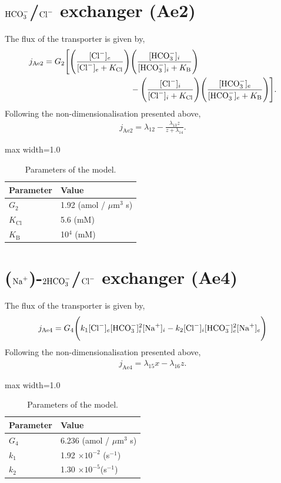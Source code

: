 \documentclass{svjour3}
\newcommand{\na}{{\rm Na}^+}
\newcommand{\bna}{[{\rm Na}^+]_i}
\newcommand{\hco}{{\rm HCO}_3^-}
\newcommand{\bhco}{[{\rm HCO}_3^-]_i}
\newcommand{\cl}{{\rm Cl}^-}
\newcommand{\bcl}{[{\rm Cl}^-]_i}
\begin{document}
\section*{\Large $\hco$/$\cl$ exchanger (Ae2)}
The flux of the transporter is given by,
\begin{align*}
j_{\text{Ae2}}=G_2 \Bigg[ \Bigg( \frac{[\cl]_e}{[\cl]_e + K_{\text{Cl}}} \Bigg)  & \Bigg( \frac{\bhco}{\bhco + K_{\text{B}}}\Bigg) \\
& -\Bigg( \frac{\bcl}{\bcl + K_{\text{Cl}}}\Bigg) \Bigg( \frac{[\hco]_e  }{[\hco]_e + K_{\text{B}}}  \Bigg) \Bigg].
\end{align*}
Following the non-dimensionalisation presented above,
\begin{align}
j_{\text{Ae2}}=\lambda_{12}-\frac{\lambda_{13} z}{z+\lambda_{14}}.
\end{align}
\begin{table}[H]
\centering
\captionsetup{justification=centering} 
\caption{Parameters of the model.}
\begin{adjustbox}{max width=1.0\textwidth}
\begin{tabular}{@{}ll@{}}
\toprule
\bf{Parameter}				& \bf{Value}										\\ \midrule
$G_2$						& 1.92	(amol / $\mu \text{m}^3$ s)				\\
$K_{\text{Cl}}$ 				& 5.6 	(mM)										\\	
$K_{\text{B}}$				& 10$^4$	(mM)										\\
\bottomrule
\end{tabular}
\end{adjustbox}
\label{table:Ae2}
\end{table}

\section*{\Large ($\na$)-$2\hco$/$\cl$ exchanger (Ae4)}
The flux of the transporter is given by,
\begin{align*}
j_{\text{Ae4}}=G_4  \Bigg( k_1 [\cl]_e &\bhco^2 \bna  - k_2 \bcl [\hco]_e^2 [\na]_e\Bigg)\\
\end{align*}
Following the non-dimensionalisation presented above,
\begin{align}
j_{\text{Ae4}}=\lambda_{15}x-\lambda_{16}z.
\end{align}
\begin{table}[H]
\centering
\captionsetup{justification=centering} 
\caption{Parameters of the model.}
\begin{adjustbox}{max width=1.0\textwidth}
\begin{tabular}{@{}ll@{}}
\toprule
\bf{Parameter}		& \bf{Value}										\\ \midrule
$G_4$				& 6.236	(amol / $\mu \text{m}^3$ s)				\\
$k_1$ 				& 1.92 $\times 10^{-2}$ 	(s$^{-1}$)				\\	
$k_2$				& 1.30 $\times 10^{-5}$(s$^{-1}$)				\\
\bottomrule
\end{tabular}
\end{adjustbox}
\label{table:Ae4}
\end{table}
\end{document}

